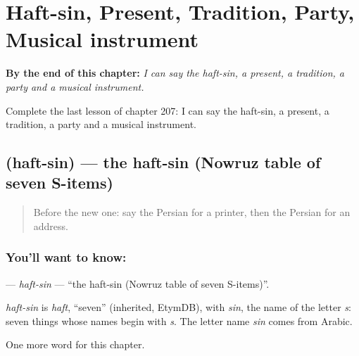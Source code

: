 
\chapter{Haft-sin, Present, Tradition, Party, Musical instrument}
\label{ch:fa-haft-sin-present-tradition-party-musical-instrument}

\begin{chapteropening}
\textbf{By the end of this chapter:} \emph{I can say the haft-sin, a present, a tradition, a party and a musical instrument.}

Complete the last lesson of chapter 207: I can say the haft-sin, a present, a tradition, a party and a musical instrument.
\end{chapteropening}

\section[\texorpdfstring{\fa{هفت} \fa{سین} (haft-sin)}{هفت سین (haft-sin)}]{  (haft-sin) — the haft-sin (Nowruz table of seven S-items)}

\label{lesson:FA-C207-haft-sin}



\begin{quote}
Before the new one: say the Persian for a printer, then the Persian for an address.
\end{quote}

\subsection*{You'll want to know:  }
\textbf{ } — \emph{haft-sin} — \textquotedblleft{}the haft-sin (Nowruz table of seven S-items)\textquotedblright{}.

\begin{cousinweb}
\emph{haft-sin} is \emph{haft}, \textquotedblleft{}seven\textquotedblright{} (inherited, EtymDB), with \emph{sin}, the name of the letter \emph{s}: seven things whose names begin with \emph{s}. The letter name \emph{sin} comes from Arabic.
\end{cousinweb}

\begin{grammarlens}[title={What you've built}]
One more word for this chapter.
\end{grammarlens}

